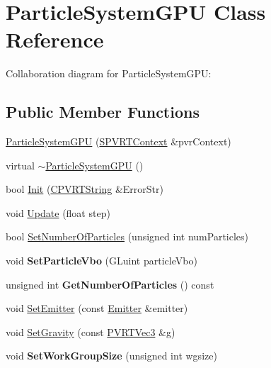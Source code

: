\hypertarget{class_particle_system_g_p_u}{\section{Particle\+System\+G\+P\+U Class Reference}
\label{class_particle_system_g_p_u}
}


Collaboration diagram for Particle\+System\+G\+P\+U\+:
\subsection*{Public Member Functions}
\begin{DoxyCompactItemize}
\item 
\hyperlink{class_particle_system_g_p_u_a45060fb111856e7f8e8cb83b7edeadaa}{Particle\+System\+G\+P\+U} (\hyperlink{struct_s_p_v_r_t_context}{S\+P\+V\+R\+T\+Context} \&pvr\+Context)
\item 
virtual \hyperlink{class_particle_system_g_p_u_aec1f2148c59af03b9cb687f33216b337}{$\sim$\+Particle\+System\+G\+P\+U} ()
\item 
bool \hyperlink{class_particle_system_g_p_u_a22d7a4c3316b4d48ee2883c96d78c3c2}{Init} (\hyperlink{class_c_p_v_r_t_string}{C\+P\+V\+R\+T\+String} \&Error\+Str)
\item 
void \hyperlink{class_particle_system_g_p_u_a1fc0c3234274e5fcf37390b0f0850173}{Update} (float step)
\item 
bool \hyperlink{class_particle_system_g_p_u_a40191836779492a670580c5a5a83a198}{Set\+Number\+Of\+Particles} (unsigned int num\+Particles)
\item 
\hypertarget{class_particle_system_g_p_u_ac75a565cfa95dfe5031a6111af015ddf}{void {\bfseries Set\+Particle\+Vbo} (G\+Luint particle\+Vbo)}\label{class_particle_system_g_p_u_ac75a565cfa95dfe5031a6111af015ddf}

\item 
\hypertarget{class_particle_system_g_p_u_a00eb6fc0fd8f777ad4ac33f3eb77518b}{unsigned int {\bfseries Get\+Number\+Of\+Particles} () const }\label{class_particle_system_g_p_u_a00eb6fc0fd8f777ad4ac33f3eb77518b}

\item 
void \hyperlink{class_particle_system_g_p_u_ab050aee98ee5fbc7c9068738ca899e2c}{Set\+Emitter} (const \hyperlink{struct_emitter}{Emitter} \&emitter)
\item 
void \hyperlink{class_particle_system_g_p_u_ab8244914fb597ef884563d2de6b74297}{Set\+Gravity} (const \hyperlink{struct_p_v_r_t_vec3}{P\+V\+R\+T\+Vec3} \&g)
\item 
\hypertarget{class_particle_system_g_p_u_aa2a2831fb1f7edd84e7e464f41b3f7eb}{void {\bfseries Set\+Work\+Group\+Size} (unsigned int wgsize)}\label{class_particle_system_g_p_u_aa2a2831fb1f7edd84e7e464f41b3f7eb}


\end{DoxyCompactItemize}
